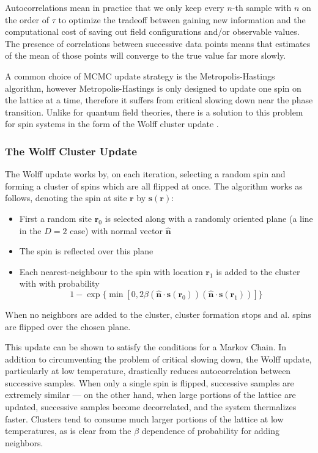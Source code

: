 \documentclass[12pt]{article}
\begin{document}
Autocorrelations mean in practice that we only keep every $n$-th sample with $n$ on the order of $\tau$ to optimize the tradeoff between gaining new information and the computational cost
of saving out field configurations and/or observable values. The presence of correlations between successive data points means that estimates of the mean of those points
will converge to the true value far more slowly.

A common choice of MCMC update strategy is the Metropolis-Hastings algorithm, however Metropolis-Hastings is only designed to update one spin on the lattice at a time, therefore
it suffers from critical slowing down near the phase transition. Unlike for quantum field theories, there is a solution to this problem for spin systems in the form
of the Wolff cluster update \cite{PhysRevLett.62.361}.

\subsubsection{The Wolff Cluster Update}

The Wolff update works by, on each iteration, selecting a random spin and forming a cluster of spins which are all flipped at once. The algorithm works as follows,
denoting the spin at site $\mathbf{r}$ by $\mathbf{s}(\mathbf{r})$:

\begin{itemize}
	\item First a random site $\mathbf{r}_0$ is selected along with a randomly oriented plane (a line in the $D=2$ case) with normal vector $\mathbf{\hat{n}}$
	\item The spin is reflected over this plane
	\item Each nearest-neighbour to the spin with location $\mathbf{r}_1$ is added to the cluster with with probability \[
		      1-\exp\{\min[0,2\beta(\mathbf{\hat{n}} \cdot \mathbf{s}(\mathbf{r}_0))(\mathbf{\hat{n}} \cdot \mathbf{s}(\mathbf{r}_1))]\}
	      \]
\end{itemize}

When no neighbors are added to the cluster, cluster formation stops and al. spins are flipped over the chosen plane.

This update can be shown to satisfy the conditions for a Markov Chain. In addition to circumventing the problem of critical slowing down, the Wolff update, particularly
at low temperature, drastically reduces autocorrelation between successive samples. When only a single spin is flipped, successive samples are extremely similar --- on the other hand, when large portions of the lattice are updated, successive samples become decorrelated, and the
system thermalizes faster. Clusters tend to consume much larger portions of the lattice at low temperatures, as is clear from the $\beta$ dependence of probability for 
adding neighbors.
\end{document}
